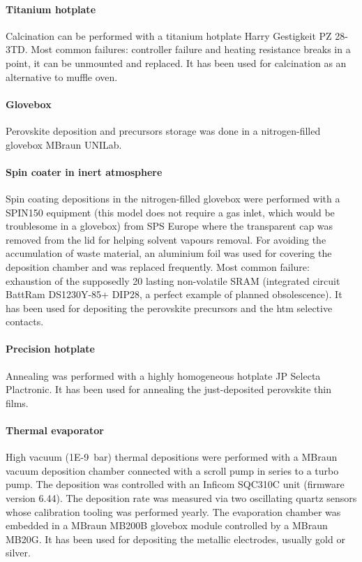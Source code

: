 		\paragraph{Titanium hotplate} Calcination can be performed with a titanium hotplate Harry Gestigkeit PZ 28-3TD.
		Most common failures: controller failure and heating resistance breaks in a point, it can be unmounted and replaced.
		It has been used for calcination as an alternative to muffle oven.

		\paragraph{Glovebox} Perovskite deposition and precursors storage was done in a nitrogen-filled glovebox MBraun UNILab.

		\paragraph{Spin coater in inert atmosphere} Spin coating depositions in the nitrogen-filled glovebox were performed with a SPIN150 equipment (this model does not require a gas inlet, which would be troublesome in a glovebox) from SPS Europe where the transparent cap was removed from the lid for helping solvent vapours removal. For avoiding the accumulation of waste material, an aluminium foil was used for covering the deposition chamber and was replaced frequently.
		Most common failure: exhaustion of the supposedly \SI{20}{\year} lasting non-volatile SRAM (integrated circuit BattRam DS1230Y-85+ DIP28, a perfect example of planned obsolescence).
		It has been used for depositing the perovskite precursors and the \gls{htm} selective contacts.

		\paragraph{Precision hotplate} Annealing was performed with a highly homogeneous hotplate JP Selecta Plactronic.
		It has been used for annealing the just-deposited perovskite thin films.

		\paragraph{Thermal evaporator} High vacuum (\SI{1E-9}{\bar}) thermal depositions were performed with a MBraun vacuum deposition chamber connected with a scroll pump in series to a turbo pump. The deposition was controlled with an Inficom SQC310C unit (firmware version 6.44). The deposition rate was measured via two oscillating quartz sensors whose calibration tooling was performed yearly. The evaporation chamber was embedded in a MBraun MB200B glovebox module controlled by a MBraun MB20G. %
		It has been used for depositing the metallic electrodes, usually gold or silver.

